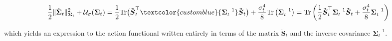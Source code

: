 \documentclass{article}
\newcommand{\bluetext}[1]{\textcolor{customblue}{#1}}
\begin{document}
\begin{small}
\begin{align}
    \frac{1}{2}\|\dot{\boldsymbol{\Sigma}}_t\|^2_{\boldsymbol{\Sigma}_t}+\mathcal{U}_\sigma(\boldsymbol{\Sigma}_t)=\frac{1}{2}\text{Tr}\big(\tilde{\boldsymbol{S}}_t^\top\bluetext{\boldsymbol{\Sigma}_t^{-1}}\tilde{\boldsymbol{S}}_t\big)+\frac{\sigma_t^4}{8}\text{Tr}\left(\boldsymbol{\Sigma}_t^{-1}\right)=\text{Tr}\left(\frac{1}{2}\tilde{\boldsymbol{S}}_t^\top\boldsymbol{\Sigma}_t^{-1}\tilde{\boldsymbol{S}}_t+\frac{\sigma_t^4}{8}\boldsymbol{\Sigma}_t^{-1}\right)\label{eq:integrand-action-func}
\end{align}
\end{small}
which yields an expression to the action functional written entirely in terms of the matrix $\tilde{\boldsymbol{S}}_t$ and the inverse covariance $\boldsymbol{\Sigma}_t^{-1}$.
\end{document}
